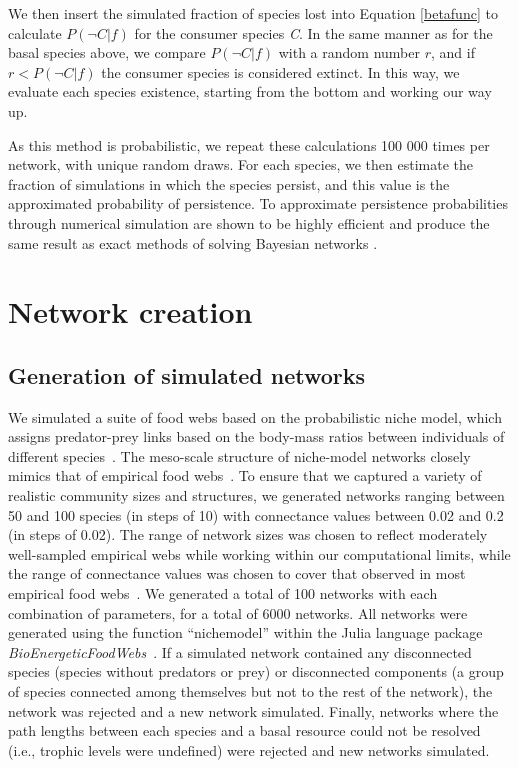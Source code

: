 \documentclass[12pt]{article}
\begin{document}
\begin{spacing}{2.0}
        
        We then insert the simulated fraction of species lost into Equation \ref{betafunc} to calculate $P(\lnot C|f)$ for the consumer species \textit{C}. 
        In the same manner as for the basal species above, we compare $P(\lnot C|f)$ with a random number $r$, and if $r < P(\lnot C|f)$ the consumer species is considered extinct. 
        In this way, we evaluate each species existence, starting from the bottom and working our way up.
        
        
        As this method is probabilistic, we repeat these calculations 100 000 times per network, with unique random draws.
        For each species, we then estimate the fraction of simulations in which the species persist, and this value is the approximated probability of persistence.
        To approximate persistence probabilities through numerical simulation are shown to be highly efficient and produce the same result as exact methods of solving Bayesian networks \citep{Haussler2020}.
        
        
\clearpage


\section{Network creation}

    \subsection*{Generation of simulated networks}

        We simulated a suite of food webs based on the probabilistic niche model, which assigns predator-prey links based on the body-mass ratios between individuals of different species~\citep{Williams2000,Delmas2017}. 
        The meso-scale structure of niche-model networks closely mimics that of empirical food webs~\citep{Stouffer2007}. 
        To ensure that we captured a variety of realistic community sizes and structures, we generated networks ranging between 50 and 100 species (in steps of 10) with connectance values between 0.02 and 0.2 (in steps of 0.02). 
        The range of network sizes was chosen to reflect moderately well-sampled empirical webs while working within our computational limits, while the range of connectance values was chosen to cover that observed in most empirical food webs~\citep{Dunne2002e}.
        We generated a total of 100 networks with each combination of parameters, for a total of 6000 networks. 
        All networks were generated using the function ``nichemodel'' within the Julia language package \emph{BioEnergeticFoodWebs}~\citep{bioenergeticfw,Delmas2017}. 
        If a simulated network contained any disconnected species (species without predators or prey) or disconnected components (a group of species connected among themselves but not to the rest of the network), the network was rejected and a new network simulated.
        Finally, networks where the path lengths between each species and a basal resource could not be resolved (i.e., trophic levels were undefined) were rejected and new networks simulated.



\end{spacing}
\end{document}
